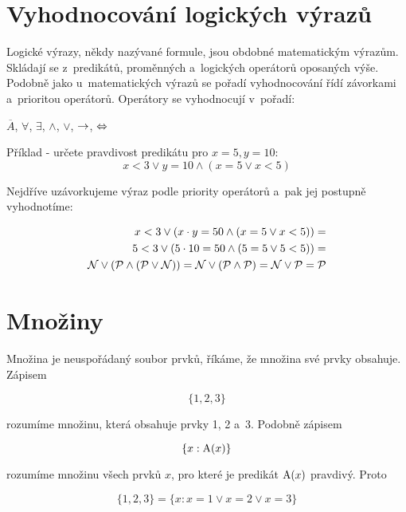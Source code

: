 \section{Vyhodnocování logických výrazů}

Logické výrazy, někdy nazývané formule, jsou obdobné matematickým výrazům. Skládají se z~predikátů, proměnných a~logických operátorů oposaných výše. Podobně jako u~matematických výrazů se pořadí vyhodnocování řídí závorkami a~prioritou operátorů. Operátory se vyhodnocují v~pořadí:

\(\overline{A}\), \(\forall\), \(\exists\), \(\land\), \(\lor\), \(\rightarrow\), \(\Leftrightarrow\)

Příklad - určete pravdivost predikátu pro \(x = 5, y = 10\):
\begin{equation}
x < 3 \lor y = 10 \land (x = 5 \lor x < 5)
\end{equation}

Nejdříve uzávorkujeme výraz podle priority operátorů a~pak jej postupně vyhodnotíme:

\begin{equation}
\begin{split}
x < 3 \lor (x \cdot y = 50 \land (x = 5 \lor x < 5)) = \\
5 < 3 \lor (5 \cdot 10 = 50 \land (5 = 5 \lor 5 < 5)) = \\
\mathcal{N} \lor (\mathcal{P} \land (\mathcal{P} \lor \mathcal{N})) = \mathcal{N} \lor (\mathcal{P} \land \mathcal{P}) = \mathcal{N} \lor \mathcal{P} = \mathcal{P} 
\end{split}
\end{equation}

\section{Množiny}

Množina je neuspořádaný soubor prvků, říkáme, že množina své prvky obsahuje. Zápisem

\begin{equation}
\{1, 2, 3\}
\end{equation}

rozumíme množinu, která obsahuje prvky 1, 2 a~3. Podobně zápisem

\begin{equation}
\{x: \mathrm{A}(x)\}
\end{equation}

rozumíme množinu všech prvků \(x\), pro které je predikát \(\mathrm{A}(x)\) pravdivý. Proto

\begin{equation}
\{1, 2, 3\} = \{x: x = 1 \lor x = 2 \lor x = 3\}
\end{equation}

